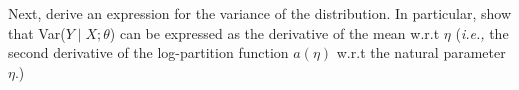 \clearpage
\item {}
Next, derive an expression for the variance of the distribution. In particular,
show that Var($Y\mid X;\theta$) can be expressed as the derivative of the mean
w.r.t $\eta$ (\emph{i.e.,} the second derivative of the log-partition
function $a(\eta)$ w.r.t the natural parameter $\eta$.)

\ifnum{}\fi
